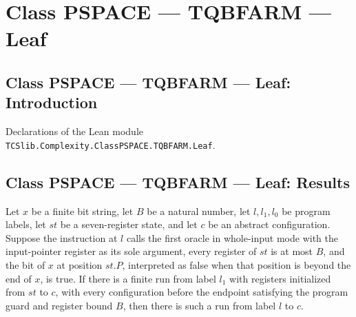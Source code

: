 \section{Class PSPACE --- TQBFARM --- Leaf}
\subsection*{Class PSPACE --- TQBFARM --- Leaf: Introduction}

Declarations of the Lean module \texttt{TCSlib.Complexity.ClassPSPACE.TQBFARM.Leaf}.

\subsection*{Class PSPACE --- TQBFARM --- Leaf: Results}

\begin{lemma}
\label{Complexity.LogProg.TQBFARM.read_t}
\leanok
{}
Let $x$ be a finite bit string, let $B$ be a natural number, let $l,l_1,l_0$ be program
labels, let $st$ be a seven-register state, and let $c$ be an abstract configuration.
Suppose the instruction at $l$ calls the first oracle in whole-input mode with the
input-pointer register as its sole argument, every register of $st$ is at most $B$, and
the bit of $x$ at position $st.P$, interpreted as false when that position is beyond the
end of $x$, is true. If there is a finite run from label $l_1$ with registers
initialized from $st$ to $c$, with every configuration before the endpoint satisfying
the program guard and register bound $B$, then there is such a run from label $l$ to
$c$.
\end{lemma}


